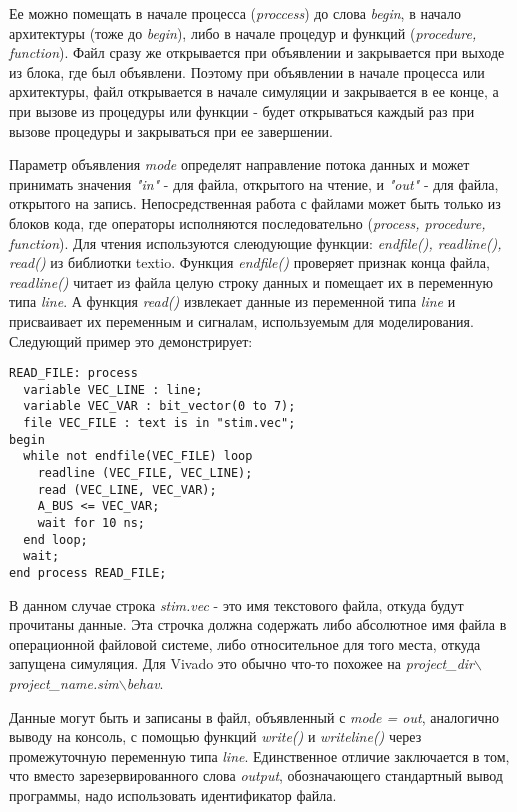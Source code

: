 Ее можно помещать в начале процесса (\emph{proccess}) до слова \emph{begin}, в начало архитектуры (тоже до \emph{begin}), либо в начале процедур и функций (\emph{procedure, function}). Файл сразу же открывается при объявлении и закрывается при выходе из блока, где был объявлени. Поэтому при объявлении в начале процесса или архитектуры, файл открывается в начале симуляции и закрывается в ее конце, а при вызове из процедуры или функции - будет открываться каждый раз при вызове процедуры и закрываться при ее завершении.

Параметр объявления \emph{mode} определят направление потока данных и может принимать значения \emph{"in"} - для файла, открытого на чтение, и \emph{"out"} - для файла, открытого на запись. Непосредственная работа с файлами может быть только из блоков кода, где операторы исполняются последовательно (\emph{process, procedure, function}). Для чтения используются слеюдующие функции: \emph{endfile(), readline(), read()} из библиотки textio. Функция \emph{endfile()} проверяет признак конца файла, \emph{readline()} читает из файла целую строку данных и помещает их в переменную типа \emph{line}. А функция \emph{read()} извлекает данные из переменной типа \emph{line} и присваивает их переменным и сигналам, используемым для моделирования. Следующий пример это демонстрирует:

\begin{Code}
\begin{lstlisting}
READ_FILE: process
  variable VEC_LINE : line;
  variable VEC_VAR : bit_vector(0 to 7);
  file VEC_FILE : text is in "stim.vec";
begin
  while not endfile(VEC_FILE) loop
    readline (VEC_FILE, VEC_LINE);
    read (VEC_LINE, VEC_VAR);
    A_BUS <= VEC_VAR;
    wait for 10 ns;
  end loop;
  wait;
end process READ_FILE;
\end{lstlisting}
\end{Code}

В данном случае строка \emph{stim.vec} - это имя текстового файла, откуда будут прочитаны данные. Эта строчка должна содержать либо абсолютное имя файла в операционной файловой системе, либо относительное для того места, откуда запущена симуляция. Для Vivado это обычно что-то похожее на \emph{project\_dir$\backslash$project\_name.sim$\backslash$behav}.

Данные могут быть и записаны в файл, объявленный с \emph{mode = out}, аналогично выводу на консоль, с помощью функций \emph{write()} и \emph{writeline()} через промежуточную переменную типа \emph{line}. Единственное отличие заключается в том, что вместо зарезервированного слова \emph{output}, обозначающего стандартный вывод программы, надо использовать идентификатор файла.

